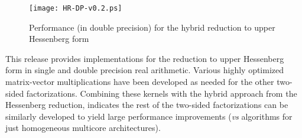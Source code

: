 \documentclass[10pt]{book}
\begin{document}
\vspace{0.1in}
\begin{figure}[!ht]
\centering
\texttt{[image: HR-DP-v0.2.ps]}
\caption{Performance (in double precision) for the hybrid reduction to 
             upper Hessenberg form}
\label{PerformanceHR}
\end{figure}

\vspace{0.1in}
This release provides implementations for the reduction to upper Hessenberg
form in single and double precision real arithmetic. Various highly optimized
matrix-vector multiplications have been developed as needed for the other
two-sided factorizations. Combining these kernels with the hybrid approach 
from the Hessenberg reduction, indicates the rest of the two-sided 
factorizations can be similarly developed to yield large performance
improvements ({\it vs} algorithms for just homogeneous multicore architectures).



\footnotesize
\newpage
\end{document}
